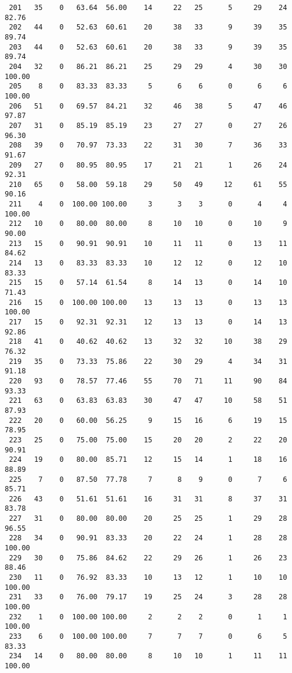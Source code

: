 \begin{verbatim}
 201   35    0   63.64  56.00    14     22   25      5     29    24    82.76
 202   44    0   52.63  60.61    20     38   33      9     39    35    89.74
 203   44    0   52.63  60.61    20     38   33      9     39    35    89.74
 204   32    0   86.21  86.21    25     29   29      4     30    30   100.00
 205    8    0   83.33  83.33     5      6    6      0      6     6   100.00
 206   51    0   69.57  84.21    32     46   38      5     47    46    97.87
 207   31    0   85.19  85.19    23     27   27      0     27    26    96.30
 208   39    0   70.97  73.33    22     31   30      7     36    33    91.67
 209   27    0   80.95  80.95    17     21   21      1     26    24    92.31
 210   65    0   58.00  59.18    29     50   49     12     61    55    90.16
 211    4    0  100.00 100.00     3      3    3      0      4     4   100.00
 212   10    0   80.00  80.00     8     10   10      0     10     9    90.00
 213   15    0   90.91  90.91    10     11   11      0     13    11    84.62
 214   13    0   83.33  83.33    10     12   12      0     12    10    83.33
 215   15    0   57.14  61.54     8     14   13      0     14    10    71.43
 216   15    0  100.00 100.00    13     13   13      0     13    13   100.00
 217   15    0   92.31  92.31    12     13   13      0     14    13    92.86
 218   41    0   40.62  40.62    13     32   32     10     38    29    76.32
 219   35    0   73.33  75.86    22     30   29      4     34    31    91.18
 220   93    0   78.57  77.46    55     70   71     11     90    84    93.33
 221   63    0   63.83  63.83    30     47   47     10     58    51    87.93
 222   20    0   60.00  56.25     9     15   16      6     19    15    78.95
 223   25    0   75.00  75.00    15     20   20      2     22    20    90.91
 224   19    0   80.00  85.71    12     15   14      1     18    16    88.89
 225    7    0   87.50  77.78     7      8    9      0      7     6    85.71
 226   43    0   51.61  51.61    16     31   31      8     37    31    83.78
 227   31    0   80.00  80.00    20     25   25      1     29    28    96.55
 228   34    0   90.91  83.33    20     22   24      1     28    28   100.00
 229   30    0   75.86  84.62    22     29   26      1     26    23    88.46
 230   11    0   76.92  83.33    10     13   12      1     10    10   100.00
 231   33    0   76.00  79.17    19     25   24      3     28    28   100.00
 232    1    0  100.00 100.00     2      2    2      0      1     1   100.00
 233    6    0  100.00 100.00     7      7    7      0      6     5    83.33
 234   14    0   80.00  80.00     8     10   10      1     11    11   100.00

\end{verbatim}
